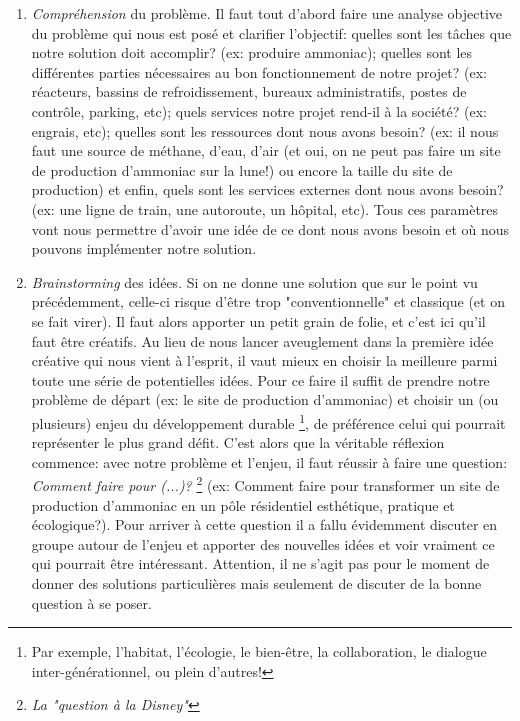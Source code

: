 \begin{enumerate}

\item \textit{Compréhension} du problème. Il faut tout d'abord faire une analyse objective du problème qui nous est posé et clarifier l'objectif: quelles sont les tâches que notre solution doit accomplir? (ex: produire ammoniac); quelles sont les différentes parties nécessaires au bon fonctionnement de notre projet? (ex: réacteurs, bassins de refroidissement, bureaux administratifs, postes de contrôle, parking, etc); quels services notre projet rend-il à la société? (ex: engrais, etc); quelles sont les ressources dont nous avons besoin? (ex: il nous faut une source de méthane, d'eau, d'air (et oui, on ne peut pas faire un site de production d'ammoniac sur la lune!) ou encore la taille du site de production) et enfin, quels sont les services externes dont nous avons besoin? (ex: une ligne de train, une autoroute, un hôpital, etc). Tous ces paramètres vont nous permettre d'avoir une idée de ce dont nous avons besoin et où nous pouvons implémenter notre solution.

\item \textit{Brainstorming} des idées. Si on ne donne une solution que sur le point vu précédemment, celle-ci risque d’être trop "conventionnelle" et classique (et on se fait virer). Il faut alors apporter un petit grain de folie, et c'est ici qu'il faut être créatifs. Au lieu de nous lancer aveuglement dans la première idée créative qui nous vient à l'esprit, il vaut mieux en choisir la meilleure parmi toute une série de potentielles idées. Pour ce faire il suffit de prendre notre problème de départ (ex: le site de production d'ammoniac) et choisir un (ou plusieurs) enjeu du développement durable \footnote{Par exemple, l'habitat, l’écologie, le bien-être, la collaboration, le dialogue inter-générationnel, ou plein d'autres!}, de préférence celui qui pourrait représenter le plus grand défit. C'est alors que la véritable réflexion commence: avec notre problème et l'enjeu, il faut réussir à faire une question: \textit{Comment faire pour (...)?} \footnote{\textit{La "question à la Disney"}} (ex: Comment faire pour transformer un site de production d'ammoniac en un pôle résidentiel esthétique, pratique et écologique?). Pour arriver à cette question il a fallu évidemment discuter en groupe autour de l'enjeu et apporter des nouvelles idées et voir vraiment ce qui pourrait être intéressant. Attention, il ne s'agit pas pour le moment de donner des solutions particulières mais seulement de discuter de la bonne question à se poser.


\end{enumerate}
